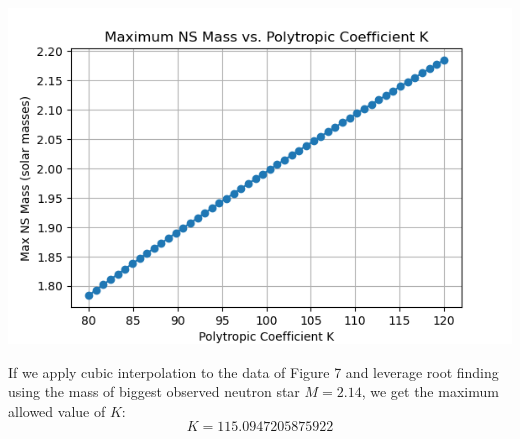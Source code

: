 \documentclass{article}
\begin{document}
\begin{center}
    \includegraphics[scale=0.65]{images_einstein/e4_max_allowed_mass_eos.png}
\end{center}
If we apply cubic interpolation to the data of Figure 7 and leverage root finding using the mass of biggest observed neutron star $M = 2.14$, we get the maximum allowed value of $K$:
\begin{equation}
    K = 115.0947205875922
\end{equation}
\end{document}
